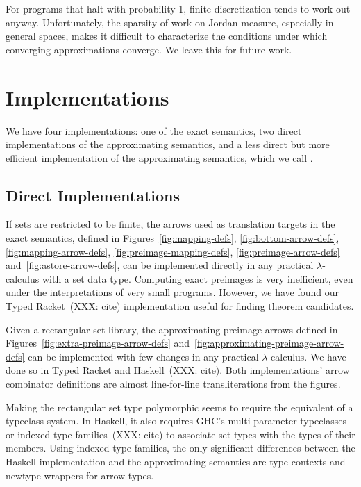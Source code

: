 \documentclass[preprint]{sigplanconf}
\begin{document}
For programs that halt with probability 1, finite discretization tends to work out anyway.
Unfortunately, the sparsity of work on Jordan measure, especially in general spaces, makes it difficult to characterize the conditions under which converging approximations converge.
We leave this for future work.


\section{Implementations}
\label{sec:implementation}

We have four implementations: one of the exact semantics, two direct implementations of the approximating semantics, and a less direct but more efficient implementation of the approximating semantics, which we call .

\subsection{Direct Implementations}

If sets are restricted to be finite, the arrows used as translation targets in the exact semantics, defined in Figures~\ref{fig:mapping-defs}, \ref{fig:bottom-arrow-defs}, \ref{fig:mapping-arrow-defs}, \ref{fig:preimage-mapping-defs}, \ref{fig:preimage-arrow-defs} and~\ref{fig:astore-arrow-defs}, can be implemented directly in any practical $\lambda$-calculus with a set data type.
Computing exact preimages is very inefficient, even under the interpretations of very small programs.
However, we have found our Typed Racket~(XXX: cite) implementation useful for finding theorem candidates.

Given a rectangular set library, the approximating preimage arrows defined in Figures~\ref{fig:extra-preimage-arrow-defs} and~\ref{fig:approximating-preimage-arrow-defs} can be implemented with few changes in any practical $\lambda$-calculus.
We have done so in Typed Racket and Haskell~(XXX: cite).
Both implementations' arrow combinator definitions are almost line-for-line transliterations from the figures.

Making the rectangular set type polymorphic seems to require the equivalent of a typeclass system.
In Haskell, it also requires GHC's multi-parameter typeclasses or indexed type families~(XXX: cite) to associate set types with the types of their members.
Using indexed type families, the only significant differences between the Haskell implementation and the approximating semantics are type contexts and newtype wrappers for arrow types.
\end{document}
